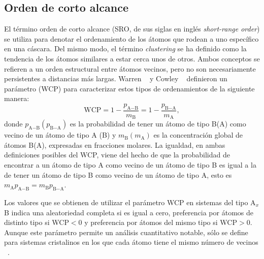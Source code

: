 \subsection{Orden de corto alcance}

El término orden de corto alcance (SRO, de sus siglas en inglés 
\textit{short-range order}) se utiliza para denotar el ordenamiento de los átomos
que rodean a uno específico en una cáscara. Del mismo modo, el término 
\textit{clustering} se ha definido como la tendencia de los átomos similares a 
estar cerca unos de otros. Ambos conceptos se refieren a un orden estructural 
entre átomos vecinos, pero no son necesariamente persistentes a distancias más 
largas. Warren ~\cite{warren69} y Cowley ~\cite{cowley1950} definieron un 
parámetro (WCP) para caracterizar estos tipos de ordenamientos de la siguiente 
manera:
\begin{equation}
    \text{WCP} = 1 - \frac{p_{\text{A}-\text{B}}}{m_\text{B}} = 1 - \frac{p_{\text{B}-\text{A}}}{m_\text{A}},
\end{equation}
donde $p_{\text{A}-\text{B}} (p_{\text{B}-\text{A}})$ es la probabilidad de tener un átomo de tipo B(A) como
vecino de un átomo de tipo A (B) y $m_\text{B} (m_\text{A})$ es la concentración global de átomos
B(A), expresadas en fracciones molares. La igualdad, en ambas definiciones 
posibles del WCP, viene del hecho de que la probabilidad de encontrar a un átomo 
de tipo A como vecino de un átomo de tipo B es igual a la de tener un átomo de 
tipo B como vecino de un átomo de tipo A, esto es $m_\text{A} p_{\text{A}-\text{B}} = m_\text{B} p_{\text{B}-\text{A}}$.

Los valores que se obtienen de utilizar el parámetro WCP en sistemas del tipo
A$_x$B indica una aleatoriedad completa si es igual a cero, preferencia por 
átomos de distinto tipo si WCP$ < 0$ y preferencia por átomos del mismo tipo si 
WCP$ > 0$. Aunque este parámetro permite un análisis cuantitativo notable, sólo
se define para sistemas cristalinos en los que cada átomo tiene el mismo número
de vecinos ~\cite{warren69}.

